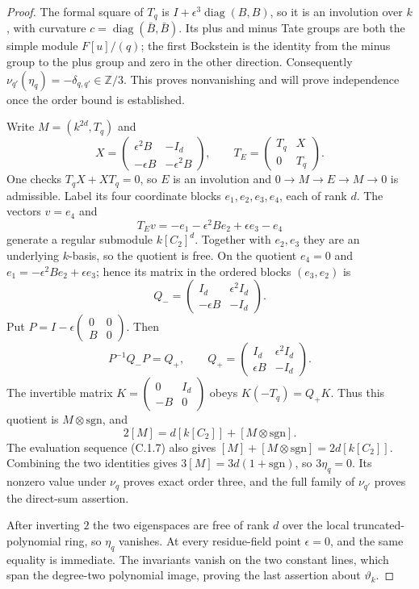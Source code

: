 \begin{proof}
The formal square of $T_q$ is
$I+\epsilon^3\operatorname{diag}(B,B)$, so it is an involution
over $k$, with curvature $c=\operatorname{diag}(\bar B,\bar B)$.
Its plus and minus Tate groups are both the simple module
$F[u]/(q)$; the first Bockstein is the identity from the minus
group to the plus group and zero in the other direction.
Consequently
$\nu_{q'}(\eta_q)=-\delta_{q,q'}\in\mathbb Z/3$.
This proves nonvanishing and will prove independence once the
order bound is established.

Write $M=(k^{2d},T_q)$ and
\[
 X=\begin{pmatrix}\epsilon^2B&-I_d\\
                    -\epsilon B&-\epsilon^2B\end{pmatrix},
 \qquad T_E=\begin{pmatrix}T_q&X\\0&T_q\end{pmatrix}.
\]
One checks $T_qX+XT_q=0$, so $E$ is an involution and
$0\to M\to E\to M\to0$ is admissible.
Label its four coordinate blocks $e_1,e_2,e_3,e_4$, each of
rank $d$. The vectors $v=e_4$ and
\[
 T_Ev=-e_1-\epsilon^2B e_2+\epsilon e_3-e_4
\]
generate a regular submodule $k[C_2]^d$. Together with $e_2,e_3$
they are an underlying $k$-basis, so the quotient is free.
On the quotient $e_4=0$ and
$e_1=-\epsilon^2B e_2+\epsilon e_3$; hence its matrix in the
ordered blocks $(e_3,e_2)$ is
\[
 Q_- =\begin{pmatrix}I_d&\epsilon^2I_d\\
                      -\epsilon B&-I_d\end{pmatrix}.
\]
Put $P=I-\epsilon
\left(\begin{smallmatrix}0&0\\B&0\end{smallmatrix}\right)$.
Then
\[
 P^{-1}Q_-P=Q_+,
 \qquad Q_+=\begin{pmatrix}I_d&\epsilon^2I_d\\
                         \epsilon B&-I_d\end{pmatrix}.
\]
The invertible matrix
$K=\left(\begin{smallmatrix}0&I_d\\-B&0\end{smallmatrix}\right)$
obeys $K(-T_q)=Q_+K$. Thus this quotient is
$M\otimes\mathrm{sgn}$, and
\[
 2[M]=d[k[C_2]]+[M\otimes\mathrm{sgn}].
\]
The evaluation sequence (C.1.7) also gives
$[M]+[M\otimes\mathrm{sgn}]=2d[k[C_2]]$.
Combining the two identities gives $3[M]=3d(1+\mathrm{sgn})$,
so $3\eta_q=0$. Its nonzero value under $\nu_q$ proves exact
order three, and the full family of $\nu_{q'}$ proves the
direct-sum assertion.

After inverting $2$ the two eigenspaces are free of rank $d$
over the local truncated-polynomial ring, so $\eta_q$ vanishes.
At every residue-field point $\epsilon=0$, and the same equality
is immediate. The invariants vanish on the two constant lines,
which span the degree-two polynomial image, proving the last
assertion about $\vartheta_k$.
\end{proof}
